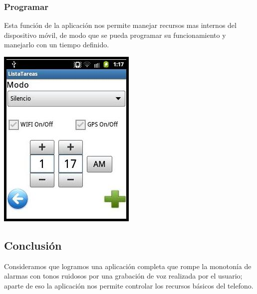 \documentclass[12pt]{article}
\begin{document}
{{{\begin{flushleft}
\newpage
\subsubsection{Programar}
\vspace{0.1in}
Esta funci\'on de la aplicaci\'on nos permite manejar recursos mas internos del dispositivo m\'ovil, de modo que se pueda programar su funcionamiento y manejarlo con un tiempo definido.\\

\begin{center}
\vspace{0.6in}
\includegraphics[scale=1.2]{imagenes_android/Programar1.jpg}
\end{center}

\newpage
\subsection{Conclusión}
Consideramos que logramos una aplicaci\'on completa que rompe la monoton\'ia de alarmas con tonos ruidosos
por una grabaci\'on de voz realizada por el usuario; aparte de eso la aplicaci\'on nos permite controlar los recursos 
b\'asicos del telefono.

\end{flushleft}}}}
\end{document}
